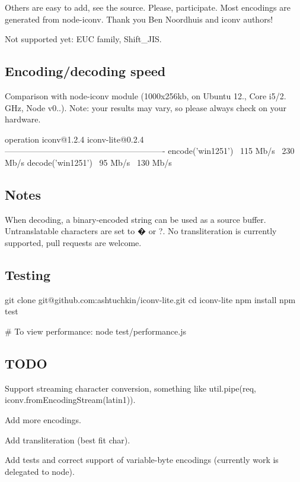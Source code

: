 Others are easy to add, see the source. Please, participate. Most encodings are generated from node-\/iconv. Thank you Ben Noordhuis and iconv authors!

Not supported yet\+: E\+U\+C family, Shift\+\_\+\+J\+I\+S.

\subsection*{Encoding/decoding speed}

Comparison with node-\/iconv module (1000x256kb, on Ubuntu 12., Core i5/2. G\+Hz, Node v0..). Note\+: your results may vary, so please always check on your hardware. \begin{DoxyVerb}operation             iconv@1.2.4   iconv-lite@0.2.4 
----------------------------------------------------------
encode('win1251')     ~115 Mb/s     ~230 Mb/s
decode('win1251')     ~95 Mb/s      ~130 Mb/s
\end{DoxyVerb}


\subsection*{Notes}

When decoding, a \textquotesingle{}binary\textquotesingle{}-\/encoded string can be used as a source buffer. Untranslatable characters are set to � or ?. No transliteration is currently supported, pull requests are welcome.

\subsection*{Testing}

\begin{DoxyVerb}git clone git@github.com:ashtuchkin/iconv-lite.git
cd iconv-lite
npm install
npm test

# To view performance:
node test/performance.js
\end{DoxyVerb}


\subsection*{T\+O\+D\+O}


\begin{DoxyItemize}
\item Support streaming character conversion, something like util.\+pipe(req, iconv.\+from\+Encoding\+Stream(\textquotesingle{}latin1\textquotesingle{})).
\item Add more encodings.
\item Add transliteration (best fit char).
\item Add tests and correct support of variable-\/byte encodings (currently work is delegated to node). 
\end{DoxyItemize}